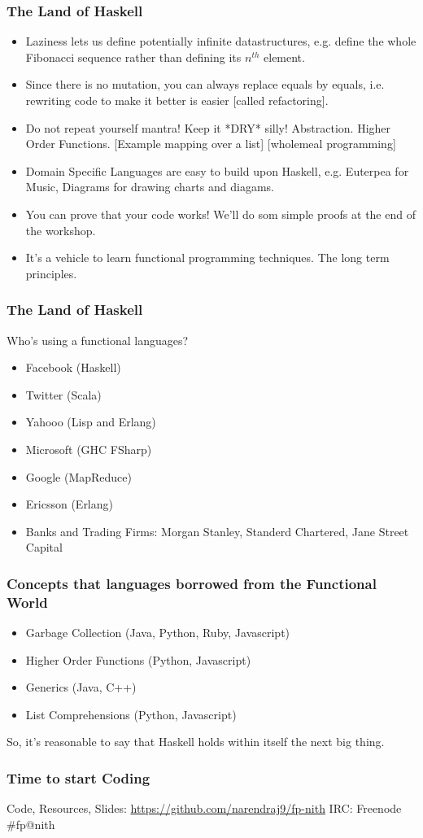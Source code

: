 \documentclass{beamer}
\begin{document}
\begin{frame}
  \frametitle{The Land of Haskell}

  \begin{itemize}
  \item Laziness lets us define potentially infinite datastructures, e.g. define the whole
    Fibonacci sequence rather than defining its $n^{th}$ element.
  \item Since there is no mutation, you can always replace equals by equals, i.e. rewriting code
    to make it better is easier [called refactoring].
  \item Do not repeat yourself mantra! Keep it *DRY* silly! Abstraction. Higher Order Functions.
    [Example mapping over a list] [wholemeal programming]
  \item Domain Specific Languages are easy to build upon Haskell, e.g. Euterpea for Music,
    Diagrams for drawing charts and diagams.
  \item You can prove that your code works! We'll do som simple proofs at the end of the workshop.
  \item It's a vehicle to learn functional programming techniques. The long term principles.
  \end{itemize}

\end{frame}

\begin{frame}[t]
  \frametitle{The Land of Haskell}

  Who's using a functional languages?

  \begin{itemize}
  \item Facebook (Haskell)
  \item Twitter (Scala)
  \item Yahooo (Lisp and Erlang)
  \item Microsoft (GHC FSharp)
  \item Google (MapReduce)
  \item Ericsson (Erlang)
  \item Banks and Trading Firms: Morgan Stanley, Standerd Chartered, Jane Street Capital
  \end{itemize}

\end{frame}


\begin{frame}[t]
  \frametitle{Concepts that languages borrowed from the Functional World}

  \begin{itemize}
  \item Garbage Collection (Java, Python, Ruby, Javascript)
  \item Higher Order Functions (Python, Javascript)
  \item Generics (Java, C++)
  \item List Comprehensions (Python, Javascript)
  \end{itemize}

  So, it's reasonable to say that Haskell holds within itself the next big thing.
\end{frame}

\begin{frame}
  \frametitle{Time to start Coding}
  Code, Resources, Slides: \url{https://github.com/narendraj9/fp-nith}
  IRC: Freenode \#fp@nith


\end{frame}
\end{document}
